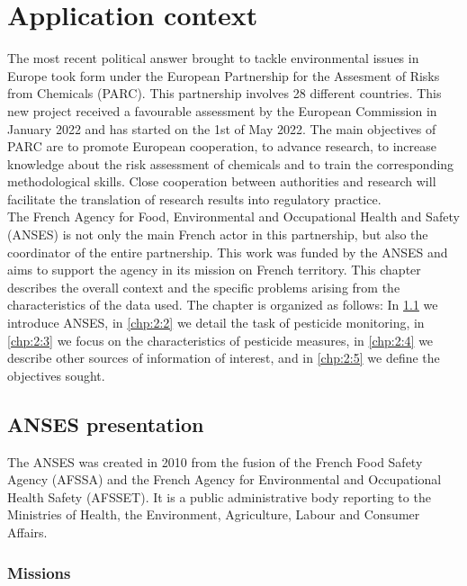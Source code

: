 \chapter{Application context}\label{chp:2}

\minitoc

\clearpage

The most recent political answer brought to tackle environmental issues in Europe took form under the European Partnership for the Assesment of Risks from Chemicals (PARC). This partnership involves 28 different countries. This new project received a favourable assessment by the European Commission in January 2022 and has started on the 1st of May 2022. The main objectives of PARC are to promote European cooperation, to advance research, to increase knowledge about the risk assessment of chemicals and to train the corresponding methodological skills. Close cooperation between authorities and research will facilitate the translation of research results into regulatory practice. \\
The French Agency for Food, Environmental and Occupational Health and Safety (ANSES) is not only the main French actor in this partnership, but also the coordinator of the entire partnership. This work was funded by the ANSES and aims to support the agency in its mission on French territory. This chapter describes the overall context and the specific problems arising from the characteristics of the data used. The chapter is organized as follows: In \ref{chp:2:1} we introduce ANSES, in \ref{chp:2:2} we detail the task of pesticide monitoring, in \ref{chp:2:3} we focus on the characteristics of pesticide measures, in \ref{chp:2:4} we describe other sources of information of interest, and in \ref{chp:2:5} we define the objectives sought.    

\section{ANSES presentation}\label{chp:2:1}

The ANSES was created in 2010 from the fusion of the French Food Safety Agency (AFSSA) and the French Agency for Environmental and Occupational Health Safety (AFSSET). It is a public administrative body reporting to the Ministries of Health, the Environment, Agriculture, Labour and Consumer Affairs.  

\subsection{Missions} 


